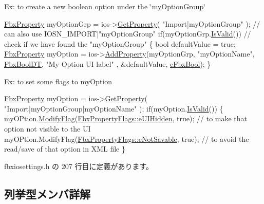 Ex\+: to create a new boolean option under the \char`\"{}my\+Option\+Group\char`\"{} 
\begin{DoxyCode}
\hyperlink{class_fbx_property}{FbxProperty} myOptionGrp = ios->\hyperlink{class_fbx_i_o_settings_aa02805702152a4ef56d337c25b12d42b}{GetProperty}( \textcolor{stringliteral}{"Import|myOptionGroup"} ); \textcolor{comment}{// can also use
       IOSN\_IMPORT|"myOptionGroup"}
\textcolor{keywordflow}{if}(myOptionGrp.\hyperlink{class_fbx_property_a1c40042c55d1f4a1d4837f06fbc1d764}{IsValid}()) \textcolor{comment}{// check if we have found the "myOptionGroup"}
\{
    \textcolor{keywordtype}{bool} defaultValue = \textcolor{keyword}{true};
      \hyperlink{class_fbx_property}{FbxProperty} myOption = ios->\hyperlink{class_fbx_i_o_settings_adcfa47da119520473f466bfff28cdbe2}{AddProperty}(myOptionGrp, \textcolor{stringliteral}{"myOptionName"}, 
      \hyperlink{fbxdatatypes_8h_a7b9d9eb0294ea5d7afe3362f668f2c94}{FbxBoolDT}, \textcolor{stringliteral}{"My Option UI label"} , &defaultValue, \hyperlink{fbxpropertytypes_8h_a73913a5ddfb20e57c6f25e9e6784bd92a4d86dfd4dbf3125592aaff150ba4deb4}{eFbxBool});
\}
\end{DoxyCode}


Ex\+: to set some flags to my\+Option 
\begin{DoxyCode}
\hyperlink{class_fbx_property}{FbxProperty} myOption = ios->\hyperlink{class_fbx_i_o_settings_aa02805702152a4ef56d337c25b12d42b}{GetProperty}( \textcolor{stringliteral}{"Import|myOptionGroup|myOptionName"} );
\textcolor{keywordflow}{if}(myOption.\hyperlink{class_fbx_property_a1c40042c55d1f4a1d4837f06fbc1d764}{IsValid}())
\{
      myOPtion.\hyperlink{class_fbx_property_a16da0381546978afc477b033239f1fc9}{ModifyFlag}(\hyperlink{class_fbx_property_flags_afabfa7e0949aac8a7dcdf8a141867e99a4da19ebe24aecee0a09724a84142aaae}{FbxPropertyFlags::eUIHidden}, \textcolor{keyword}{true});   \textcolor{comment}{// to
       make that option not visible to the UI}
      myOPtion.ModifyFlag(\hyperlink{class_fbx_property_flags_afabfa7e0949aac8a7dcdf8a141867e99a11531771ac2c7b07d8b49641028f2b57}{FbxPropertyFlags::eNotSavable}, \textcolor{keyword}{true}); \textcolor{comment}{// to avoid
       the read/save of that option in XML file}
\}
\end{DoxyCode}
 

 fbxiosettings.\+h の 207 行目に定義があります。



\subsection{列挙型メンバ詳解}
\mbox{\label{class_fbx_i_o_settings_a8a5d3220d6ca36856bb81bcb1f4c779b}} 
